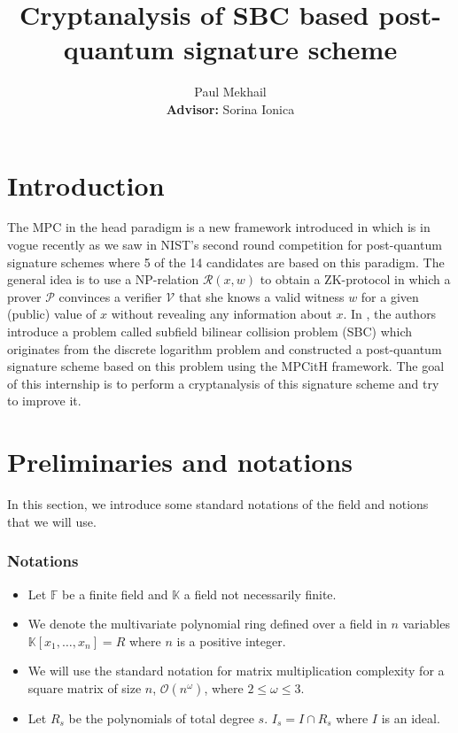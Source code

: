 \documentclass[english]{article}
\author{Paul Mekhail\\ \textbf{Advisor:} Sorina Ionica}
\title{Cryptanalysis of SBC based post-quantum signature scheme}
\begin{document}
	\maketitle
	
	\section{Introduction}
		The MPC in the head paradigm is a new framework introduced in \cite{IKOS07} which is in vogue recently as we saw in NIST's second round competition for post-quantum signature schemes where 5 of the 14 candidates are based on this paradigm.
		The general idea is to use a NP-relation $\mathcal{R}(x, w)$ to obtain a ZK-protocol in which a prover $\mathcal{P}$ convinces a verifier $\mathcal{V}$ that she knows a valid witness $w$ for a given (public) value of $x$ without revealing any information about $x$.
		In \cite{HJ23}, the authors introduce a problem called subfield bilinear collision problem (SBC) which originates from the discrete logarithm problem and constructed a post-quantum signature scheme based on this problem using the MPCitH framework.
		The goal of this internship is to perform a cryptanalysis of this signature scheme and try to improve it.
		
	\section{Preliminaries and notations}
		In this section, we introduce some standard notations of the field and notions that we will use.
		
		\subsubsection{Notations}
		
		\begin{itemize}
			\item Let $\mathbb{F}$ be a finite field and $\mathbb{K}$ a field not necessarily finite. 
			\item We denote the multivariate polynomial ring defined over a field in $n$ variables $\mathbb{K}[x_1,\dots,x_n] = R$ where $n$ is a positive integer.
			\item We will use the standard notation for matrix multiplication complexity for a square matrix of size $n$, $\mathcal{O}(n^\omega)$,
			where $2 \leq \omega \leq 3$.
			\item Let $R_{s}$ be the polynomials of total degree $s$. $I_{s} = I \cap R_{s}$ where $I$ is an ideal.
		\end{itemize}
		
\end{document}
